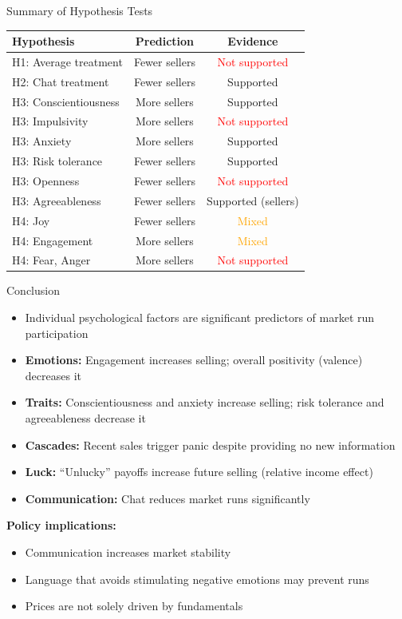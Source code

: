 \documentclass{beamer}
\begin{document}
\begin{frame}{Summary of Hypothesis Tests}
\begin{center}
\begin{tabular}{lcc}
\toprule
\textbf{Hypothesis} & \textbf{Prediction} & \textbf{Evidence} \\
\midrule
H1: Average treatment & Fewer sellers & \textcolor{red}{Not supported} \\
H2: Chat treatment & Fewer sellers & \textcolor{green!50!black}{Supported} \\
H3: Conscientiousness & More sellers & \textcolor{green!50!black}{Supported} \\
H3: Impulsivity & More sellers & \textcolor{red}{Not supported}\\
H3: Anxiety & More sellers & \textcolor{green!50!black}{Supported} \\
H3: Risk tolerance & Fewer sellers & \textcolor{green!50!black}{Supported} \\
H3: Openness & Fewer sellers & \textcolor{red}{Not supported}\\
H3: Agreeableness & Fewer sellers & \textcolor{green!50!black}{Supported (sellers)} \\
H4: Joy & Fewer sellers & \textcolor{orange}{Mixed} \\
H4: Engagement & More sellers & \textcolor{orange}{Mixed}\\
H4: Fear, Anger & More sellers & \textcolor{red}{Not supported}\\
\bottomrule
\end{tabular}
\end{center}
\end{frame}


\begin{frame}{Conclusion}
\begin{itemize}
    \item Individual psychological factors are significant predictors of market run participation
    \item \textbf{Emotions:} Engagement increases selling; overall positivity (valence) decreases it
    \item \textbf{Traits:} Conscientiousness and anxiety increase selling; risk tolerance and agreeableness decrease it
    \item \textbf{Cascades:} Recent sales trigger panic despite providing no new information
    \item \textbf{Luck:} ``Unlucky'' payoffs increase future selling (relative income effect)
    \item \textbf{Communication:} Chat reduces market runs significantly
\end{itemize}

\vspace{0.3cm}
\textbf{Policy implications:}
\begin{itemize}
    \item Communication increases market stability
    \item Language that avoids stimulating negative emotions may prevent runs
    \item Prices are not solely driven by fundamentals
\end{itemize}
\end{frame}
\end{document}
